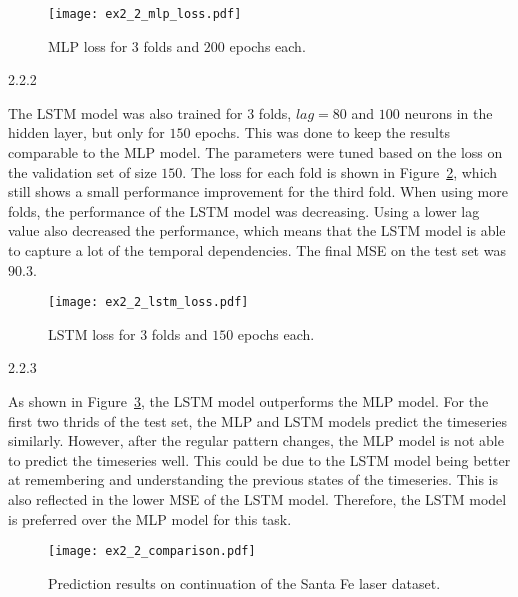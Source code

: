 \begin{figure}[ht!]
  \centering
  \texttt{[image: ex2\_2\_mlp\_loss.pdf]}
  \caption{MLP loss for $3$ folds and $200$ epochs each.}
  \label{fig:ex2_2_mlp_loss}
\end{figure}



\begin{task}{2.2.2}
\end{task}

The LSTM model was also trained for $3$ folds, $lag = 80$ and $100$ neurons in the hidden layer, but
only for $150$ epochs. This was done to keep the results comparable to the MLP model. The parameters
were tuned based on the loss on the validation set of size $150$. The loss for each fold is shown in
Figure~\ref{fig:ex2_2_lstm_loss}, which still shows a small performance improvement for the third
fold. When using more folds, the performance of the LSTM model was decreasing. Using a lower lag
value also decreased the performance, which means that the LSTM model is able to capture a lot of
the temporal dependencies. The final MSE on the test set was $90.3$.

\begin{figure}[ht!]
  \centering
  \texttt{[image: ex2\_2\_lstm\_loss.pdf]}
  \caption{LSTM loss for $3$ folds and $150$ epochs each.}
  \label{fig:ex2_2_lstm_loss}
\end{figure}



\begin{task}{2.2.3}
\end{task}

As shown in Figure~\ref{fig:ex2_2_comparison}, the LSTM model outperforms the MLP model. For the
first two thrids of the test set, the MLP and LSTM models predict the timeseries similarly. However,
after the regular pattern changes, the MLP model is not able to predict the timeseries well. This
could be due to the LSTM model being better at remembering and understanding the previous states of
the timeseries. This is also reflected in the lower MSE of the LSTM model. Therefore, the LSTM model
is preferred over the MLP model for this task.

\begin{figure}[ht!]
  \centering
  \texttt{[image: ex2\_2\_comparison.pdf]}
  \caption{Prediction results on continuation of the Santa Fe laser dataset.}
  \label{fig:ex2_2_comparison}
\end{figure}
